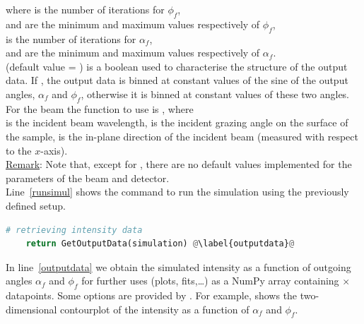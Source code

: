 \noindent where  is the number of iterations for $\phi_f$,\\  and 
are the minimum and maximum values respectively of $\phi_f$, \\  is
the number of iterations for $\alpha_f$,\\  and  
are the minimum and maximum values respectively of
$\alpha_f$. \\
 (default value = ) is a boolean
used to characterise the structure of the output data. If
, the output data is binned at constant
values of the sine of the output angles, $\alpha_f$ and $\phi_f$, otherwise it is binned
at constant values of these two angles.\\


\noindent For the beam the function to use is
, where\\
 is the incident beam wavelength,
 is the incident
grazing angle on the surface of the sample,
 is the in-plane
direction of the incident beam (measured with respect to the
$x$-axis).\\ 

\noindent \underline{Remark}: Note that, except for
, there are no default values implemented for the
parameters of the beam and detector.\\

\noindent Line~\ref{runsimul} shows the command to run the simulation using the
previously defined setup.


\begin{lstlisting}[language=python, style=eclipseboxed,name=ex1,nolol]
    # retrieving intensity data
    return GetOutputData(simulation) @\label{outputdata}@
\end{lstlisting}


\noindent In line~\ref{outputdata} we obtain the simulated intensity
as a function of outgoing angles $\alpha_f$ and $\phi_f$ for further
uses (plots, fits,\ldots) as a NumPy array containing
$\times$
datapoints. Some options are provided by \BornAgain. For example,  shows the two-dimensional
contourplot of the intensity as a function of $\alpha_f$ and
$\phi_f$. 

